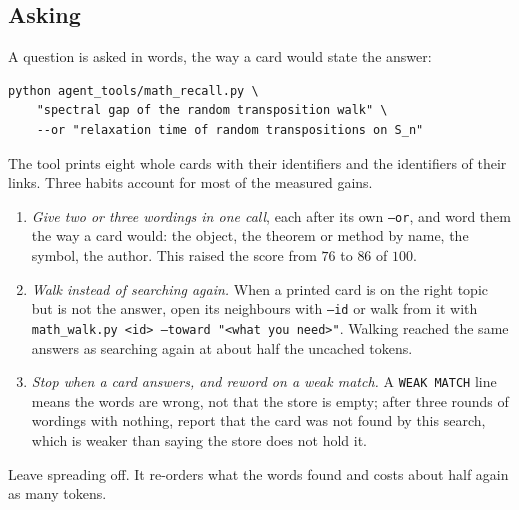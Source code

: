 \subsection{Asking}
A question is asked in words, the way a card would state the answer:
\begin{verbatim}
python agent_tools/math_recall.py \
    "spectral gap of the random transposition walk" \
    --or "relaxation time of random transpositions on S_n"
\end{verbatim}
The tool prints eight whole cards with their identifiers and the identifiers of their links. Three habits account for most of the measured gains.
\begin{enumerate}[label=(\roman*)]
\item \emph{Give two or three wordings in one call}, each after its own \texttt{--or}, and word them the way a card would: the object, the theorem or method by name, the symbol, the author. This raised the score from $76$ to $86$ of $100$.
\item \emph{Walk instead of searching again.} When a printed card is on the right topic but is not the answer, open its neighbours with \texttt{--id} or walk from it with \texttt{math\_walk.py <id> --toward "<what you need>"}. Walking reached the same answers as searching again at about half the uncached tokens.
\item \emph{Stop when a card answers, and reword on a weak match.} A \texttt{WEAK MATCH} line means the words are wrong, not that the store is empty; after three rounds of wordings with nothing, report that the card was not found by this search, which is weaker than saying the store does not hold it.
\end{enumerate}
Leave spreading off. It re-orders what the words found and costs about half again as many tokens.

